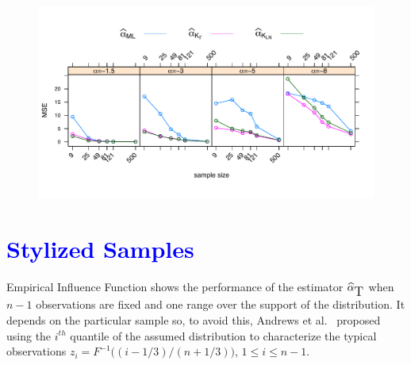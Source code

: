 \documentclass[a0,portrait]{a0poster}
\begin{document}
\begin{multicols}{3}
	
\begin{center}
	\begin{minipage}[t]{0.96\linewidth}
	\begin{figure}
		\includegraphics[scale=1]{../../../../Figures/IVJIAAIS2017/Cont/ECM_500_L3MVconX0yGAyLN_OPTIM_hasta500_MOM1_2_SinCte_Ver2FINALeps05.pdf}
		\end{figure}
	\end{minipage}
\end{center}


\section*{\textcolor{blue}{Stylized Samples}}
Empirical Influence Function shows the performance of the estimator $\widehat{\alpha}_{\text{\tiny{T}}}$ when $n-1$ observations are fixed and one range over the support of the distribution. It depends on the particular sample so, to avoid this, Andrews et al.~\cite{Andrews1972} proposed using the $i^{th}$ quantile of the assumed distribution to characterize the typical observations $z_i=F^{-1}\big((i-1/3)/(n+1/3) \big)$, $1\leq i\leq n-1$.


\end{multicols}
\end{document}
